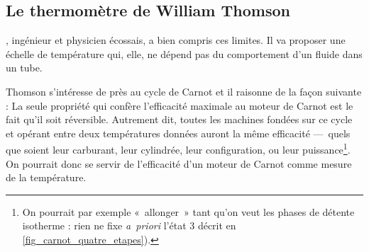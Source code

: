 	
	\subsection{Le thermomètre de William Thomson}
	
		, ingénieur et physicien écossais, a bien compris ces limites. Il va proposer une échelle de température qui, elle, ne dépend pas du comportement d’un fluide dans un tube.

		Thomson s’intéresse de près au cycle de Carnot et il raisonne de la façon suivante : La seule propriété qui confère l’efficacité maximale au moteur de Carnot est le fait qu’il soit réversible. Autrement dit, toutes les machines fondées sur ce cycle et opérant entre deux températures données auront la même efficacité —\ quels que soient leur carburant, leur cylindrée, leur configuration, ou leur puissance\footnote{On pourrait par exemple «~allonger~» tant qu’on veut les phases de détente isotherme : rien ne fixe \textit{a~priori} l’état 3 décrit en \cref{fig_carnot_quatre_etapes}).}. On pourrait donc se servir de l’efficacité d’un moteur de Carnot comme mesure de la température.
		
